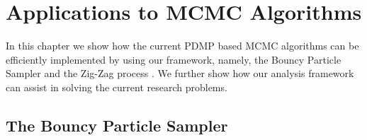 \documentclass[report.tex]{subfiles}
\begin{document}
\chapter{Applications to MCMC Algorithms}
\label{chapter-mcmc-applications}

In this chapter we show how the current PDMP based MCMC algorithms can be
efficiently implemented by using our framework, namely, the Bouncy Particle
Sampler \cite{bouchard2015bouncy} and the Zig-Zag process \cite{bierkens2016zig}.
We further show how our analysis framework can assist in solving the current
research problems.

\section{The Bouncy Particle Sampler}
\end{document}
